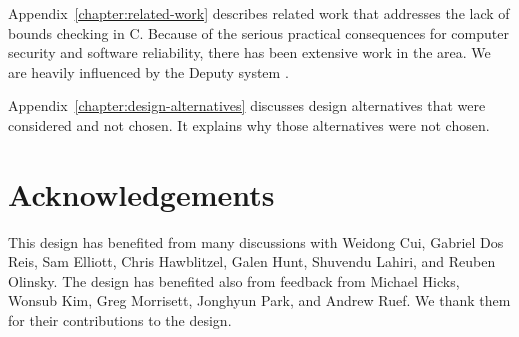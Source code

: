 Appendix~\ref{chapter:related-work} describes related work that addresses
the lack of bounds checking in C.  Because of the serious practical consequences
for computer security and software reliability, there has been extensive work
in the area.  We are heavily influenced by the Deputy system \cite{Feng2006,Condit2007}.

Appendix~\ref{chapter:design-alternatives} discusses design alternatives
that were considered and not chosen.  It explains why those alternatives were
not chosen.

\section{Acknowledgements}

This design has benefited from many discussions with Weidong Cui, Gabriel Dos Reis,
Sam Elliott, Chris Hawblitzel, Galen Hunt, Shuvendu Lahiri, and Reuben Olinsky.  The design has
benefited also from feedback from Michael Hicks, Wonsub Kim, Greg
Morrisett, Jonghyun Park, and Andrew Ruef. We thank them for their contributions to
the design.



